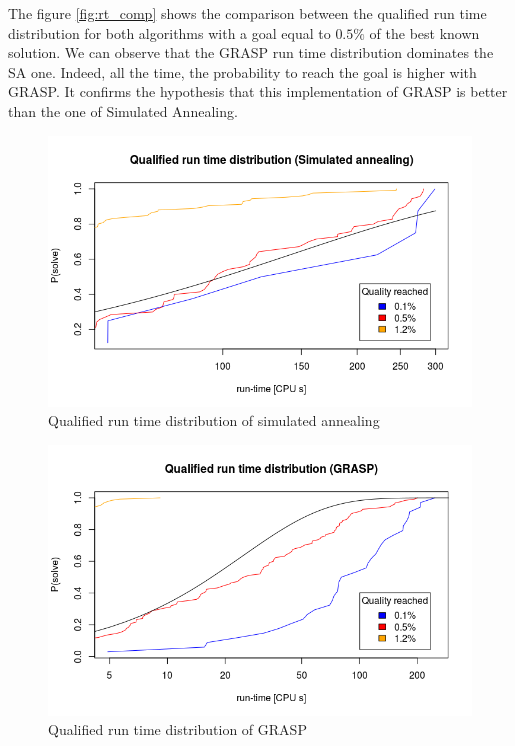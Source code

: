 \documentclass{article}
\begin{document}
The figure \ref{fig:rt_comp} shows the comparison between the qualified run time distribution for both algorithms with a goal equal to $0.5\%$ of the best known solution.
We can observe that the GRASP run time distribution dominates the SA one.
Indeed, all the time, the probability to reach the goal is higher with GRASP.
It confirms the hypothesis that this implementation of GRASP is better than the one of Simulated Annealing.

\begin{figure}
    \centering
        \includegraphics[scale=0.5]{images/rt_sa}
    \caption{Qualified run time distribution of simulated annealing}
    \label{fig:rt_sa}
\end{figure}

\begin{figure}
    \centering
        \includegraphics[scale=0.5]{images/rt_grasp}
    \caption{Qualified run time distribution of GRASP}
    \label{fig:rt_grasp}
\end{figure}
\end{document}
